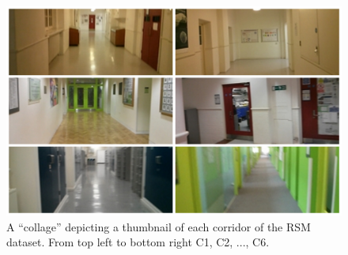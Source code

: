 \begin{figure}[t]
\centering
\includegraphics[width=\linewidth]{./gfx/Chapter04/rsm_collage.jpg}
\caption{A ``collage'' depicting a thumbnail of each corridor of the RSM dataset. From top left to bottom right C1, C2, ..., C6.}
\label{fig:IsoPool}
\end{figure}


